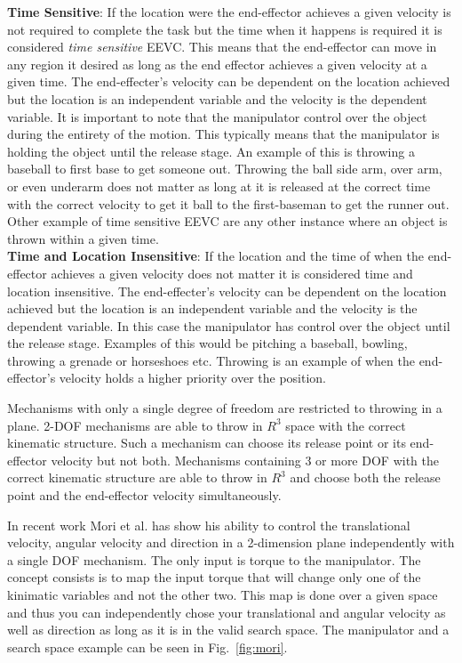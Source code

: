 \noindent \textbf{Time Sensitive}: 
If the location were the end-effector achieves a given velocity is not required to complete the task but the time when it happens is required it is considered \textit{time sensitive} EEVC. 
This means that the end-effector can move in any region it desired as long as the end effector achieves a given velocity at a given time.
The end-effecter's velocity can be dependent on the location achieved but the location is an independent variable and the velocity is the dependent variable.
It is important to note that the manipulator control over the object during the entirety of the motion.
This typically means that the manipulator is holding the object until the release stage.
An example of this is throwing a baseball to first base to get someone out.
Throwing the ball side arm, over arm, or even underarm does not matter as long at it is released at the correct time with the correct velocity to get it ball to the first-baseman to get the runner out.
Other example of time sensitive EEVC are any other instance where an object is thrown within a given time. \\




\noindent \textbf{Time and Location Insensitive}:
If the location and the time of when the end-effector achieves a given velocity does not matter it is considered time and location insensitive.  
The end-effecter's velocity can be dependent on the location achieved but the location is an independent variable and the velocity is the dependent variable.
In this case the manipulator has control over the object until the release stage.
Examples of this would be pitching a baseball, bowling, throwing a grenade or horseshoes etc.
Throwing is an example of when the end-effector's velocity holds a higher priority over the position.  


Mechanisms with only a single degree of freedom are restricted to throwing in a plane.   2-DOF mechanisms are able to throw in $R^3$ space with the correct kinematic structure.
Such a mechanism can choose its release point or its end-effector velocity but not both.
Mechanisms containing 3 or more DOF with the correct kinematic structure are able to throw in $R^3$ and choose both the release point and the end-effector velocity simultaneously. 

In recent work Mori et al. \cite{5152525} has show his ability to control the translational velocity, angular velocity and direction in a 2-dimension plane independently with a single DOF mechanism.
The only input is torque to the manipulator.
The concept consists is to map the input torque that will change only one of the kinimatic variables and not the other two.
This map is done over a given space and thus you can independently chose your translational and angular velocity as well as direction as long as it is in the valid search space.
The manipulator and a search space example can be seen in Fig.~\ref{fig:mori}. 

